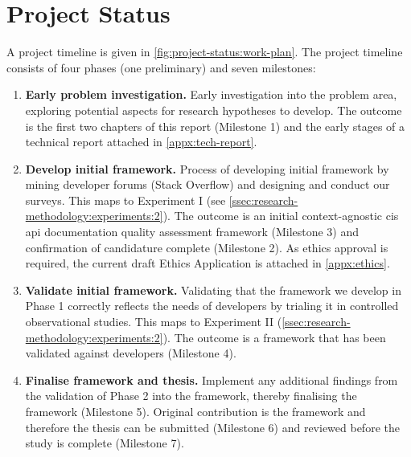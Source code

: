\chapter{Project Status}
\label{ch:project-status}

\graphicspath{{mainmatter/project-status/figures/}}

A project timeline is given in \cref{fig:project-status:work-plan}. The project timeline consists of four phases (one preliminary) and seven milestones:

\bigskip
\begin{enumerate}[label=\textbf{Phase \arabic*.},start=0,leftmargin=2.5cm]
  \item \textbf{Early problem investigation.} Early investigation into the problem area, exploring potential aspects for research hypotheses to develop. The outcome is the first two chapters of this report (Milestone 1) and the early stages of a technical report attached in \cref{appx:tech-report}.
  \item \textbf{Develop initial framework.} Process of developing initial framework by mining developer forums (Stack Overflow) and designing and conduct our surveys. This maps to Experiment I (see \cref{ssec:research-methodology:experiments:2}). The outcome is an initial context-agnostic \gls{cis} \gls{api} documentation quality assessment framework (Milestone 3) and confirmation of candidature complete (Milestone 2). As ethics approval is required, the current draft Ethics Application is attached in \cref{appx:ethics}.
  \item \textbf{Validate initial framework.} Validating that the framework we develop in Phase 1 correctly reflects the needs of developers by trialing it in controlled observational studies. This maps to Experiment II (\cref{ssec:research-methodology:experiments:2}). The outcome is a framework that has been validated against developers (Milestone 4).
  \item \textbf{Finalise framework and thesis.} Implement any additional findings from the validation of Phase 2 into the framework, thereby finalising the framework (Milestone 5). Original contribution is the framework and therefore the thesis can be submitted (Milestone 6) and reviewed before the study is complete (Milestone 7).
\end{enumerate}


